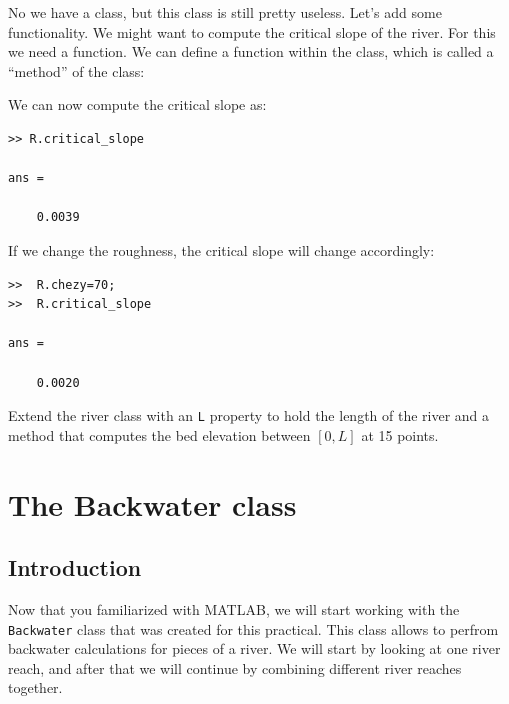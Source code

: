 \documentclass[a4paper]{article}
\begin{document}
No we have a class, but this class is still pretty useless. Let's add some functionality. We might want to compute the critical slope of the river. For this we need a function. We can define a function within the class, which is called a ``method'' of the class:


We can now compute the critical slope as:
\begin{lstlisting}
>> R.critical_slope

ans =

    0.0039

\end{lstlisting}
If we change the roughness, the critical slope will change accordingly:
\begin{lstlisting}
>>  R.chezy=70;
>>  R.critical_slope

ans =

    0.0020

\end{lstlisting}

\begin{exercise}
  Extend the river class with an \lstinline=L= property to hold the length of the river and a method that computes the bed elevation between $[0, L]$ at 15 points.
\end{exercise}
\begin{solution}

\end{solution}


\section{The Backwater class}
\label{sec:backwater_class}

\subsection{Introduction}
Now that you familiarized with MATLAB, we will start working with the \lstinline=Backwater= class that was created for this practical. This class allows to perfrom backwater calculations for pieces of a river. We will start by looking at one river reach, and after that we will continue by combining different river reaches together.
\end{document}
